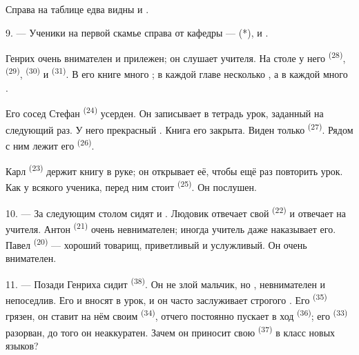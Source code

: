 Справа на таблице едва видны   и
.


\VUsaut{2.4mm}

\VUsaut{3.0mm}

9. --- Ученики на первой скамье справа от кафедры --- 
(*),  и .

Генрих очень внимателен и прилежен; он слушает учителя. На столе у него
 \textsuperscript{(28)},  \textsuperscript{(29)},
 \textsuperscript{(30)} и  \textsuperscript{(31)}. В его книге
много ; в каждой главе несколько , а в
каждой  много .

Его сосед Стефан \textsuperscript{(24)} усерден. Он записывает в тетрадь урок,
заданный на следующий раз. У него прекрасный . Книга его
закрыта. Виден только  \textsuperscript{(27)}. Рядом с ним лежит
его  \textsuperscript{(26)}.

Карл \textsuperscript{(23)} держит книгу в руке; он открывает её, чтобы ещё раз
повторить урок. Как у всякого ученика, перед ним стоит
 \textsuperscript{(25)}. Он послушен.

10. --- За следующим столом сидят  и .
Людовик отвечает свой  \textsuperscript{(22)} и отвечает на
 учителя. Антон \textsuperscript{(21)} очень невнимателен; иногда
учитель даже наказывает его. Павел \textsuperscript{(20)} --- хороший товарищ,
приветливый и услужливый. Он очень внимателен.

\VUsaut{4.2mm}
\VUsaut{3.2mm}

11. --- Позади Генриха сидит  \textsuperscript{(38)}. Он не злой
мальчик, но , невнимателен и непоседлив. Его
 и  вносят  в
урок, и он часто заслуживает строгого . Его
 \textsuperscript{(35)} грязен, он ставит на нём 
своим  \textsuperscript{(34)}, отчего постоянно пускает в ход
 \textsuperscript{(36)}; его  \textsuperscript{(33)} разорван,
до того он неаккуратен. Зачем он приносит свою 
\textsuperscript{(37)} в класс новых языков?

